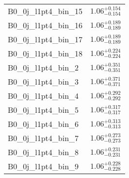 \begin{tabular}{|l|c|}
B0\_0j\_l1pt4\_bin\_15 & $1.06^{+0.154}_{-0.154}$ \\
B0\_0j\_l1pt4\_bin\_16 & $1.06^{+0.189}_{-0.189}$ \\
B0\_0j\_l1pt4\_bin\_17 & $1.06^{+0.189}_{-0.189}$ \\
B0\_0j\_l1pt4\_bin\_18 & $1.06^{+0.224}_{-0.224}$ \\
B0\_0j\_l1pt4\_bin\_2 & $1.06^{+0.351}_{-0.351}$ \\
B0\_0j\_l1pt4\_bin\_3 & $1.06^{+0.371}_{-0.371}$ \\
B0\_0j\_l1pt4\_bin\_4 & $1.06^{+0.292}_{-0.292}$ \\
B0\_0j\_l1pt4\_bin\_5 & $1.06^{+0.317}_{-0.317}$ \\
B0\_0j\_l1pt4\_bin\_6 & $1.06^{+0.313}_{-0.313}$ \\
B0\_0j\_l1pt4\_bin\_7 & $1.06^{+0.273}_{-0.273}$ \\
B0\_0j\_l1pt4\_bin\_8 & $1.06^{+0.231}_{-0.231}$ \\
B0\_0j\_l1pt4\_bin\_9 & $1.06^{+0.228}_{-0.228}$ \\
\hline
\end{tabular}
